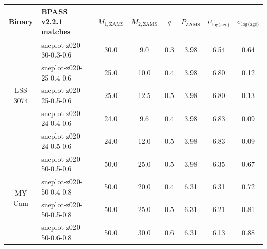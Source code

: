 \begin{table}
    \centering
    \renewcommand{\arraystretch}{1.2}
    \begin{tabular}{c|l|c|c|c|c||c|c}
         \toprule
         Binary                       & BPASS v2.2.1 matches    & $M_{1, \mathrm{ZAMS}}$ & $M_{2, \mathrm{ZAMS}}$ & $q$     & $P_{\mathrm{ZAMS}}$ & $\mu_\text{log(age)}$ & $\sigma_\text{log(age)}$ \\
         \midrule
         \multirow{5}{*}{LSS 3074}    & sneplot-z020-30-0.3-0.6 &          30.0          &          9.0           &   0.3   &        3.98         & 6.54                  & 0.64                     \\
                                      & sneplot-z020-25-0.4-0.6 &          25.0          &          10.0          &   0.4   &        3.98         & 6.80                  & 0.12                     \\
                                      & sneplot-z020-25-0.5-0.6 &          25.0          &          12.5          &   0.5   &        3.98         & 6.80                  & 0.13                     \\
                                      & sneplot-z020-24-0.4-0.6 &          24.0          &          9.6           &   0.4   &        3.98         & 6.83                  & 0.09                     \\
                                      & sneplot-z020-24-0.5-0.6 &          24.0          &          12.0          &   0.5   &        3.98         & 6.83                  & 0.09                     \\
                                        \midrule
         \multirow{5}{*}{MY Cam}      & sneplot-z020-50-0.5-0.6 &          50.0          &          25.0          &   0.5   &        3.98         & 6.35                  & 0.67                     \\
                                      & sneplot-z020-50-0.4-0.8 &          50.0          &          20.0          &   0.4   &        6.31         & 6.31                  & 0.72                     \\
                                      & sneplot-z020-50-0.5-0.8 &          50.0          &          25.0          &   0.5   &        6.31         & 6.21                  & 0.81                     \\
                                      & sneplot-z020-50-0.6-0.8 &          50.0          &          30.0          &   0.6   &        6.31         & 6.13                  & 0.88                     \\

\end{tabular}
\end{table}

